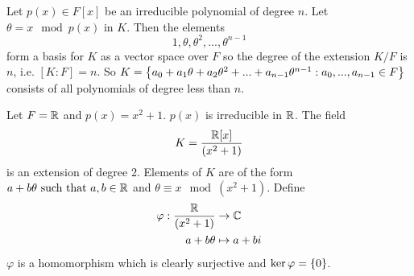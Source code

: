 \begin{theorem}
    Let $p(x) \in F[x]$ be an irreducible polynomial of degree $n$. Let $\theta = x \mod p(x)$ in $K$. Then the elements
    $$1, \theta, \theta^2, ..., \theta^{n-1}$$
    form a basis for $K$ as a vector space over $F$ so the degree of the extension $K/F$ is $n$, i.e. $[K:F] = n$. So $K = \left\{a_0 + a_1\theta + a_2\theta^2 +... + a_{n-1}\theta^{n-1} : a_0, ..., a_{n-1}\in F\right\}$ consists of all polynomials of degree less than $n$.
\end{theorem}

\begin{example}
    Let $F = \mathbb{R}$ and $p(x) = x^2 + 1$. $p(x)$ is irreducible in $\mathbb{R}$. The field
    $$K = \frac{\mathbb{R}[x]}{(x^2+1)}$$
    is an extension of degree $2$. Elements of $K$ are of the form $a + b\theta \text{ such that } a,b \in \mathbb{R}$ and $\theta \equiv x \mod (x^2+1)$. Define
    \begin{align*}
        \varphi: \frac{\mathbb{R}}{(x^2+1)} &\to \mathbb{C} \\
        a+b\theta &\mapsto a+bi
    \end{align*}
    $\varphi$ is a homomorphism which is clearly surjective and $\ker\varphi = \left\{0\right\}$.
\end{example}